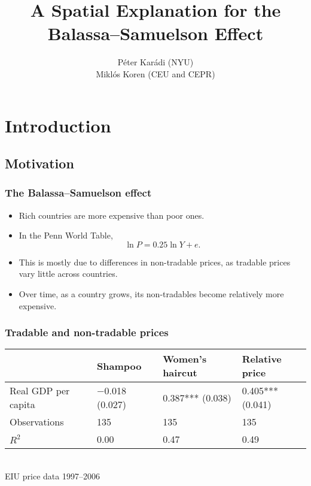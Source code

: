 \documentclass[compress,mathserif]{beamer}
\title[Balassa--Samuelson]%
{A Spatial Explanation for the\\ Balassa--Samuelson Effect}
\author[Kar\'adi and Koren] %
{P\'eter Kar\'adi (NYU)\\
Mikl\'os Koren (CEU and CEPR)}
\date %
{}
\newcounter{perc}
\newcounter{percek}
\renewcommand{\time}[1]{\addtocounter{percek}{#1}}
\begin{document}
\begin{frame}[plain]
  \titlepage
    \addtocounter{framenumber}{-1}
\end{frame}


\section{Introduction}

\subsection{Motivation}
\begin{frame}\frametitle{The Balassa--Samuelson effect}

\begin{itemize}
    \item Rich countries are more expensive than poor ones.
    \item In the Penn World Table,
    \[
    \ln P = 0.25\ln Y + e.
    \]
    \pause
    \item This is mostly due to differences in non-tradable prices, as tradable prices vary little across countries.
    \item Over time, as a country grows, its non-tradables become relatively more expensive.
\end{itemize}
\end{frame}

\time{2}

\begin{frame}\frametitle{Tradable and non-tradable prices}
\begin{center}
\begin{tabular}{lm{5em}m{5em}m{5em}}
  \hline
   & Shampoo & Women's haircut & Relative price\\
   \hline
  Real GDP per capita & $-$0.018   (0.027) & 0.387***   (0.038) & 0.405***   (0.041)\\
\hline
  Observations &  135 & 135 & 135
\\
  $R^2$ &  0.00& 0.47 & 0.49
\\
  \hline
\end{tabular}\\
{\small EIU price data 1997--2006}
\end{center}
\end{frame}
\end{document}
